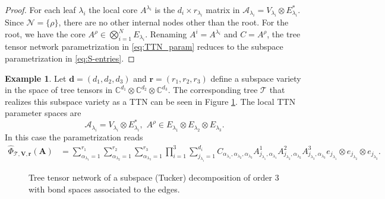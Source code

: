 \documentclass[12pt]{article}
\theoremstyle{definition}
\newtheorem{example}[theorem]{Example}
\numberwithin{theorem}{section}
\newcommand{\CC}{\mathbb{C}}
\begin{document}
\begin{proof}
For each leaf $\lambda_i$ the local core $A^{\lambda_i}$  is the $d_i \times r_{\lambda_i}$ matrix  in $\mathcal A_{\lambda_i} = V_{\lambda_i}\otimes E_{\lambda_i}^*$. Since $\mathscr{N} = \{\rho\}$, there are no other internal nodes other than the root. For the root, we have the core $A^\rho \in \bigotimes_{i=1}^{N} E_{\lambda_i}$. Renaming
$A^i = A^{\lambda_i}$ and $C = A^\rho$, the tree tensor network parametrization in \eqref{eq:TTN_param} reduces to the subspace parametrization in \eqref{eq:S-entries}.
\end{proof}
\begin{example}
Let $\mathbf d=(d_1,d_2, d_3)$ and 
$\mathbf{r} = (r_1, r_2, r_3)$
define a subspace variety in the space of tree tensors in $\CC^{d_1} \otimes \CC^{d_2} \otimes \CC^{d_3}$. 
The corresponding tree $\mathscr{T}$
that realizes this subspace variety as a TTN can be seen in Figure \ref{fig:subspace_combinatorial_tree}. The local TTN parameter spaces are
\begin{equation*}
    \mathcal A_{\lambda_i} = V_{\lambda_i}\otimes E_{\lambda_i}^*, \,\, A^\rho \in E_{\lambda_1} \otimes E_{\lambda_2} \otimes E_{\lambda_3}.
\end{equation*}
In this case the parametrization reads 
\begin{align*}
\widehat{\Phi}_{\mathscr{T}, \mathbf{V}, \mathbf{r}}(\mathbf{A})     &= \sum_{\alpha_{\lambda_1}=1}^{r_1}\sum_{\alpha_{\lambda_2}=1}^{r_2}
\sum_{\alpha_{\lambda_3}=1}^{r_3}\prod_{i=1}^{3}\sum_{j_{\lambda_i}=1}^{d_i} C_{\alpha_{\lambda_1}, \alpha_{\lambda_2}, \alpha_{\lambda_3}}A^1_{j_{\lambda_1}, \alpha_{\lambda_1}} A^2_{j_{\lambda_2}, \alpha_{\lambda_2}}A^3_{j_{\lambda_3}, \alpha_{\lambda_3}} e_{j_{\lambda_1}}\otimes e_{j_{\lambda_2}} \otimes e_{j_{\lambda_3}}. 
\end{align*}
\end{example}
\begin{figure}[h!]
    \centering
    \caption{Tree tensor network of a subspace (Tucker) decomposition of order 3 with bond spaces associated to the edges.}
    \label{fig:subspace_combinatorial_tree}
\end{figure}
\end{document}
